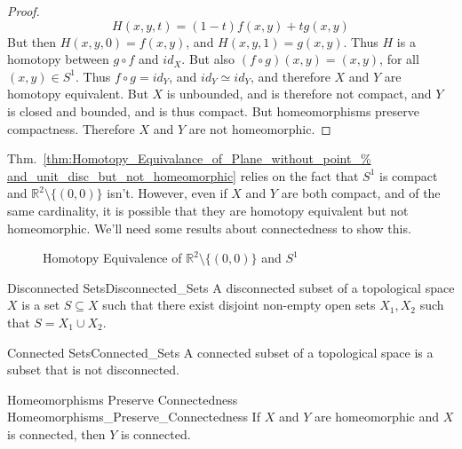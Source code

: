 \begin{proof}
                \begin{equation}
                    H(x,y,t)=(1-t)f(x,y)+tg(x,y)
                \end{equation}
                But then $H(x,y,0)=f(x,y)$, and $H(x,y,1)=g(x,y)$. Thus $H$ is a
                homotopy between ${g}\circ{f}$ and $id_{X}$. But also
                $({f}\circ{g})(x,y)=(x,y)$, for all $(x,y)\in S^{1}$.
                Thus ${f}\circ{g}=id_{Y}$, and ${id_{Y}}\simeq{id_{Y}}$,
                and therefore $X$ and $Y$ are homotopy equivalent.
                But $X$ is unbounded, and is therefore not compact,
                and $Y$ is closed and bounded, and is thus compact.
                But homeomorphisms preserve compactness. Therefore $X$
                and $Y$ are not homeomorphic.
            \end{proof}
            Thm.~\ref{thm:Homotopy_Equivalance_of_Plane_without_point_%
                      and_unit_disc_but_not_homeomorphic}
            relies on the fact that $S^{1}$ is compact and
            $\mathbb{R}^{2}\setminus\{(0,0)\}$ isn't. However, even if $X$ and
            $Y$ are both compact, and of the same cardinality, it is possible
            that they are homotopy equivalent but not homeomorphic. We'll need
            some results about connectedness to show this.
            \begin{figure}[H]
                \captionsetup{type=figure}
                \centering
                
                \caption{Homotopy Equivalence of
                         $\mathbb{R}^{2}\setminus\{(0,0)\}$ and $S^{1}$}
                \label{fig:homotopy_equivalence_between_the_plane_%
                       with_a_point_removed_and_the_unit_circle}
            \end{figure}
            \begin{ldefinition}{Disconnected Sets}{Disconnected_Sets}
                A disconnected subset of a topological space $X$ is a set
                $S\subseteq{X}$ such that there exist disjoint non-empty open
                sets $X_{1},X_{2}$ such that $S=X_{1}\cup{X_{2}}$.
            \end{ldefinition}
            \begin{ldefinition}{Connected Sets}{Connected_Sets}
                A connected subset of a topological space
                is a subset that is not disconnected.
            \end{ldefinition}
            \begin{ltheorem}{Homeomorphisms Preserve Connectedness}
                            {Homeomorphisms_Preserve_Connectedness}
                If $X$ and $Y$ are homeomorphic and
                $X$ is connected, then $Y$ is connected.
            \end{ltheorem}
